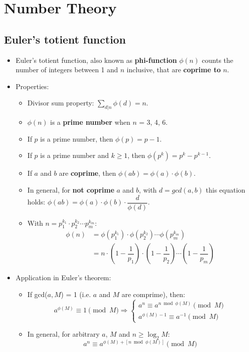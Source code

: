 \section{Number Theory}

\subsection{Euler's totient function}
\begin{itemize}[leftmargin=*]
  \item Euler's totient function, also known as \textbf{phi-function} $\phi(n)$
  counts the number of integers between 1 and $n$ inclusive, that are
  \textbf{coprime to} $n$.
  \item Properties:
  \begin{itemize}[leftmargin=0.25cm]
    \item Divisor sum property: $\sum\limits_{d | n} \phi(d) = n$.
    \item $\phi(n)$ is a \textbf{prime number} when $n$ = 3, 4, 6.
    \item If $p$ is a prime number, then $\phi(p) = p - 1$.
    \item If $p$ is a prime number and $k \geq 1$, then $\phi(p^k) = p^k - p^{k - 1}$.
    \item If $a$ and $b$ are \textbf{coprime}, then $\phi(ab) = \phi(a) \cdot \phi(b)$.
    \item In general, for \textbf{not coprime} $a$ and $b$, with $d = gcd(a, b)$ this equation holds:
    $\phi(ab) = \phi(a) \cdot \phi(b) \cdot \dfrac{d}{\phi(d)}$.
    \item With $n = p_1^{k_1} \cdot p_2^{k_2} \cdots p_m^{k_m}$:
    \begin{align*}
      \phi(n) &= \phi(p_1^{k_1}) \cdot \phi(p_2^{k_2}) \cdots \phi(p_m^{k_m}) \\
      &= n \cdot \left(1 - \dfrac{1}{p_1}\right) \cdot \left(1 - \dfrac{1}{p_2}\right) \cdots \left(1 - \dfrac{1}{p_m}\right)
    \end{align*}
  \end{itemize}
  \item Application in Euler's theorem:
  \begin{itemize}[leftmargin=0.25cm]
    \item If gcd($a, M$) = 1 (i.e. $a$ and $M$ are comprime), then:
    \[ a^{\phi(M)} \equiv 1 \pmod M \Rightarrow
      \begin{cases}
        a^{n} \equiv a^{n \bmod \phi(M)} \pmod M \\
        a^{\phi(M) - 1} \equiv a^{-1} \pmod M
      \end{cases} \]
    \item In general, for arbitrary $a$, $M$ and $n \geq \log_2{M}$:
    \[ a^{n} \equiv a^{\phi(M) + [n \bmod \phi(M)]} \pmod M \]
  \end{itemize}
\end{itemize}

